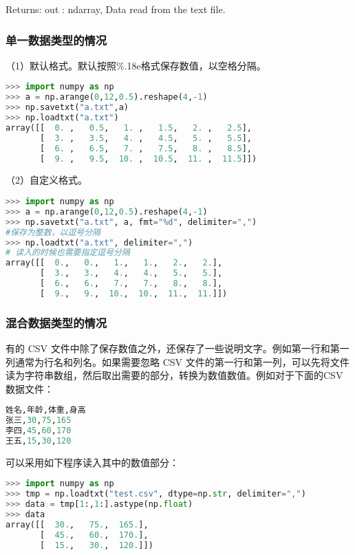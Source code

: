 Returns: out : ndarray, Data read from the text file.


\subsubsection{单一数据类型的情况}
（1）默认格式。默认按照\%.18e格式保存数值，以空格分隔。
\begin{lstlisting}[language=Python]
>>> import numpy as np
>>> a = np.arange(0,12,0.5).reshape(4,-1)
>>> np.savetxt("a.txt",a)
>>> np.loadtxt("a.txt")
array([[  0. ,   0.5,   1. ,   1.5,   2. ,   2.5],
       [  3. ,   3.5,   4. ,   4.5,   5. ,   5.5],
       [  6. ,   6.5,   7. ,   7.5,   8. ,   8.5],
       [  9. ,   9.5,  10. ,  10.5,  11. ,  11.5]])
\end{lstlisting}

（2）自定义格式。
\begin{lstlisting}[language=Python]
>>> import numpy as np
>>> a = np.arange(0,12,0.5).reshape(4,-1)
>>> np.savetxt("a.txt", a, fmt="%d", delimiter=",")
#保存为整数，以逗号分隔
>>> np.loadtxt("a.txt", delimiter=",")
# 读入的时候也需要指定逗号分隔
array([[  0.,   0.,   1.,   1.,   2.,   2.],
       [  3.,   3.,   4.,   4.,   5.,   5.],
       [  6.,   6.,   7.,   7.,   8.,   8.],
       [  9.,   9.,  10.,  10.,  11.,  11.]])
\end{lstlisting}


\subsubsection{混合数据类型的情况}
有的 CSV 文件中除了保存数值之外，还保存了一些说明文字。例如第一行和第一列通常为行名和列名。如果需要忽略 CSV 文件的第一行和第一列，可以先将文件读为字符串数组，然后取出需要的部分，转换为数值数值。例如对于下面的CSV数据文件：
\begin{lstlisting}[language=Python]
姓名,年龄,体重,身高
张三,30,75,165
李四,45,60,170
王五,15,30,120
\end{lstlisting}
可以采用如下程序读入其中的数值部分：
\begin{lstlisting}[language=Python]
>>> import numpy as np
>>> tmp = np.loadtxt("test.csv", dtype=np.str, delimiter=",")
>>> data = tmp[1:,1:].astype(np.float)
>>> data
array([[  30.,   75.,  165.],
       [  45.,   60.,  170.],
       [  15.,   30.,  120.]])
\end{lstlisting}










